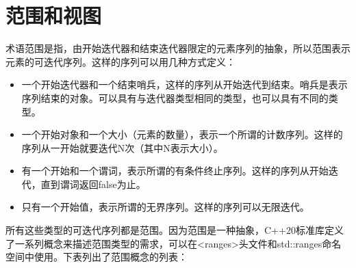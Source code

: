 \section{范围和视图}

术语范围是指，由开始迭代器和结束迭代器限定的元素序列的抽象，所以范围表示元素的可迭代序列。这样的序列可以用几种方式定义：

\begin{itemize}
  \item
        一个开始迭代器和一个结束哨兵，这样的序列从开始迭代到结束。哨兵是表示序列结束的对象。可以具有与迭代器类型相同的类型，也可以具有不同的类型。

  \item
        一个开始对象和一个大小（元素的数量），表示一个所谓的计数序列。这样的序列从一开始就要迭代N次（其中N表示大小）。

  \item
        有一个开始和一个谓词，表示所谓的有条件终止序列。这样的序列从开始迭代，直到谓词返回false为止。

  \item
        只有一个开始值，表示所谓的无界序列。这样的序列可以无限迭代。
\end{itemize}

所有这些类型的可迭代序列都是范围。因为范围是一种抽象，C++20标准库定义了一系列概念来描述范围类型的需求，可以在<ranges>头文件和std::ranges命名空间中使用。下表列出了范围概念的列表：

